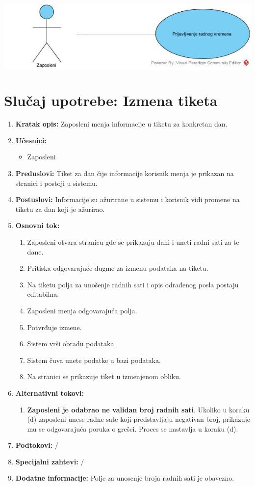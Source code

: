 \documentclass[a4paper]{article}
\begin{document}
\includegraphics[scale=0.5]{PrijavljivanjeRadnogVremena.jpg}

\section{Slučaj upotrebe: Izmena tiketa}
\begin{enumerate}
    \item \textbf{Kratak opis:} Zaposleni menja informacije u tiketu za konkretan dan.
    \item \textbf{Učesnici:}
        \begin{itemize}
            \item Zaposleni
        \end{itemize}
    \item \textbf{Preduslovi:} Tiket za dan čije informacije korisnik menja je prikazan na stranici i postoji u sistemu.
    \item \textbf{Postuslovi:} Informacije su ažurirane u sistemu i korisnik vidi promene na tiketu za dan koji je ažurirao.
    \item \textbf{Osnovni tok:}
        \begin{enumerate}
            \item Zaposleni otvara stranicu gde se prikazuju dani i uneti radni sati za te dane.
            \item Pritiska odgovarajuće dugme za izmenu podataka na tiketu.
            \item Na tiketu polja za unošenje radnih sati i opis odrađenog posla postaju editabilna.
            \item Zaposleni menja odgovarajuća polja.
            \item Potvrđuje izmene.
            \item Sistem vrši obradu podataka.
            \item Sistem čuva unete podatke u bazi podataka.
            \item Na stranici se prikazuje tiket u izmenjenom obliku.
        \end{enumerate}
    \item \textbf{Alternativni tokovi:}
        \begin{enumerate}
            \item \textbf{Zaposleni je odabrao ne validan broj radnih sati}. Ukoliko u koraku (d) zaposleni unese radne sate koji predstavljaju negativan broj, prikazuje mu se odgovarajuća poruka o grešci. Proces se nastavlja u koraku (d).
        \end{enumerate}
    \item \textbf{Podtokovi:} /
    \item \textbf{Specijalni zahtevi:} /
    \item \textbf{Dodatne informacije:} Polje za unosenje broja radnih sati je obavezno.
\end{enumerate}
\end{document}
